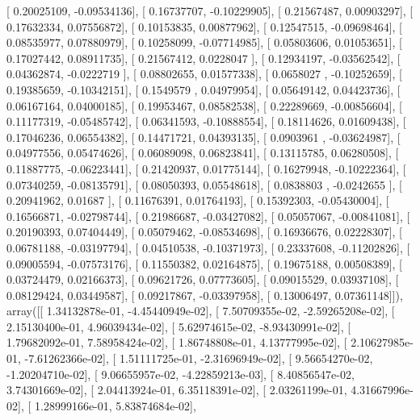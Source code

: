 \documentclass{article}
\begin{document}
       [ 0.20025109, -0.09534136],
       [ 0.16737707, -0.10229905],
       [ 0.21567487,  0.00903297],
       [ 0.17632334,  0.07556872],
       [ 0.10153835,  0.00877962],
       [ 0.12547515, -0.09698464],
       [ 0.08535977,  0.07880979],
       [ 0.10258099, -0.07714985],
       [ 0.05803606,  0.01053651],
       [ 0.17027442,  0.08911735],
       [ 0.21567412,  0.0228047 ],
       [ 0.12934197, -0.03562542],
       [ 0.04362874, -0.0222719 ],
       [ 0.08802655,  0.01577338],
       [ 0.0658027 , -0.10252659],
       [ 0.19385659, -0.10342151],
       [ 0.1549579 ,  0.04979954],
       [ 0.05649142,  0.04423736],
       [ 0.06167164,  0.04000185],
       [ 0.19953467,  0.08582538],
       [ 0.22289669, -0.00856604],
       [ 0.11177319, -0.05485742],
       [ 0.06341593, -0.10888554],
       [ 0.18114626,  0.01609438],
       [ 0.17046236,  0.06554382],
       [ 0.14471721,  0.04393135],
       [ 0.0903961 , -0.03624987],
       [ 0.04977556,  0.05474626],
       [ 0.06089098,  0.06823841],
       [ 0.13115785,  0.06280508],
       [ 0.11887775, -0.06223441],
       [ 0.21420937,  0.01775144],
       [ 0.16279948, -0.10222364],
       [ 0.07340259, -0.08135791],
       [ 0.08050393,  0.05548618],
       [ 0.0838803 , -0.0242655 ],
       [ 0.20941962,  0.01687   ],
       [ 0.11676391,  0.01764193],
       [ 0.15392303, -0.05430004],
       [ 0.16566871, -0.02798744],
       [ 0.21986687, -0.03427082],
       [ 0.05057067, -0.00841081],
       [ 0.20190393,  0.07404449],
       [ 0.05079462, -0.08534698],
       [ 0.16936676,  0.02228307],
       [ 0.06781188, -0.03197794],
       [ 0.04510538, -0.10371973],
       [ 0.23337608, -0.11202826],
       [ 0.09005594, -0.07573176],
       [ 0.11550382,  0.02164875],
       [ 0.19675188,  0.00508389],
       [ 0.03724479,  0.02166373],
       [ 0.09621726,  0.07773605],
       [ 0.09015529,  0.03937108],
       [ 0.08129424,  0.03449587],
       [ 0.09217867, -0.03397958],
       [ 0.13006497,  0.07361148]]), array([[  1.34132878e-01,  -4.45440949e-02],
       [  7.50709355e-02,  -2.59265208e-02],
       [  2.15130400e-01,   4.96039434e-02],
       [  5.62974615e-02,  -8.93430991e-02],
       [  1.79682092e-01,   7.58958424e-02],
       [  1.86748808e-01,   4.13777995e-02],
       [  2.10627985e-01,  -7.61262366e-02],
       [  1.51111725e-01,  -2.31696949e-02],
       [  9.56654270e-02,  -1.20204710e-02],
       [  9.06655957e-02,  -4.22859213e-03],
       [  8.40856547e-02,   3.74301669e-02],
       [  2.04413924e-01,   6.35118391e-02],
       [  2.03261199e-01,   4.31667996e-02],
       [  1.28999166e-01,   5.83874684e-02],
\end{document}
